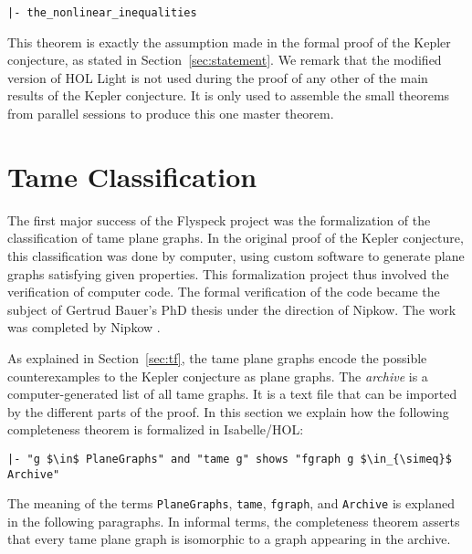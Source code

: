 \begin{verbatim}
|- the_nonlinear_inequalities
\end{verbatim}

This theorem is exactly the assumption made in the formal proof
of the Kepler conjecture, as stated in Section~\ref{sec:statement}.
We remark that the modified version of HOL Light is not used during
the proof of any other of the main results of the Kepler conjecture.
It is only used to assemble the small theorems from parallel sessions
to produce this one master theorem.

\section{Tame Classification}\label{sec:tc}



The first major success of the Flyspeck project was the formalization
of the classification of tame plane graphs. In the original proof of
the Kepler conjecture, this classification was done by computer, using
custom software to generate plane graphs satisfying given
properties. This formalization project thus involved the verification
of computer code. The formal verification of the code became the
subject of Gertrud Bauer's PhD thesis under the direction of
Nipkow. The work was completed by Nipkow \cite{NipkowBS-IJCAR06}.

As explained in Section~\ref{sec:tf}, the tame plane graphs encode
the possible counterexamples to the Kepler conjecture as plane
graphs. The {\it archive} is a computer-generated list of all tame
graphs. It is a text file that can be imported by the different parts
of the proof. In this section we explain how the following
completeness theorem is formalized in Isabelle/HOL:

\begin{lstlisting}[keepspaces=true,stringstyle=\tt,basicstyle=\small,%
frame=none,framesep=8pt,mathescape,morekeywords={and,shows},columns=flexible]
|- "g $\in$ PlaneGraphs" and "tame g" shows "fgraph g $\in_{\simeq}$ Archive"
\end{lstlisting}

The meaning of the
terms \verb!PlaneGraphs!, \verb!tame!, \verb!fgraph!, and
\verb!Archive! is explaned in the following paragraphs.
In informal terms, the completeness theorem 
asserts that every tame plane graph is
isomorphic to a graph appearing in the archive.  

